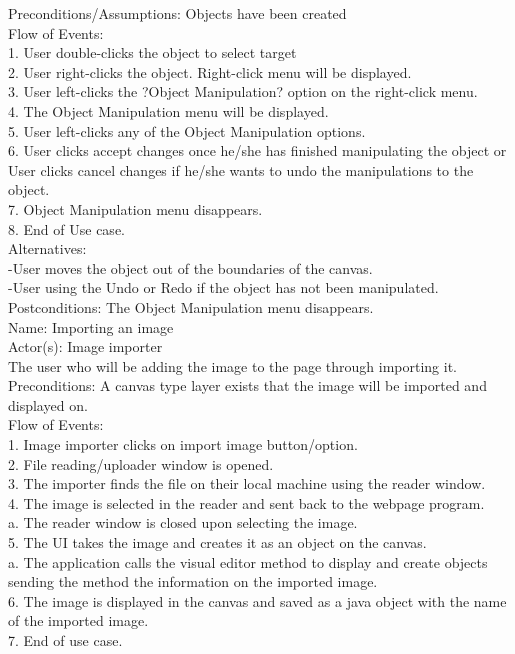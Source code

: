 \documentclass[12pt]{report}
\begin{document}
Preconditions/Assumptions: Objects have been created\\[1\baselineskip]
Flow of Events: \\
1. User double-clicks the object to select target\\
2. User right-clicks the object. Right-click menu will be displayed.\\
3. User left-clicks the ?Object Manipulation? option on the right-click menu.\\
4. The Object Manipulation menu will be displayed. \\
5. User left-clicks any of the Object Manipulation options.\\
6. User clicks accept changes once he/she has finished manipulating the object or User clicks cancel changes if he/she wants to undo the manipulations to the object.\\
7. Object Manipulation menu disappears.\\
8. End of Use case.\\[1\baselineskip]
Alternatives:\\
-User moves the object out of the boundaries of the canvas.\\
-User using the Undo or Redo if the object has not been manipulated. \\[1\baselineskip]
Postconditions: The Object Manipulation menu disappears.\\[2\baselineskip]

Name: Importing an image\\
Actor(s): Image importer\\
The user who will be adding the image to the page through importing it.\\
Preconditions: A canvas type layer exists that the image will be imported and displayed on.\\[0\baselineskip]

Flow of Events:\\
1.       Image importer clicks on import image button/option.\\
2.       File reading/uploader window is opened.\\
3.       The importer finds the file on their local machine using the reader window.\\
4.       The image is selected in the reader and sent back to the webpage program.\\
a.       The reader window is closed upon selecting the image.\\
5.        The UI takes the image and creates it as an object on the canvas.\\
a.       The application calls the visual editor method to display and create objects sending the method the information on the imported image.\\
6.       The image is displayed in the canvas and saved as a java object with the name of the imported image. \\
7.       End of use case.\\[0\baselineskip]
\end{document}
